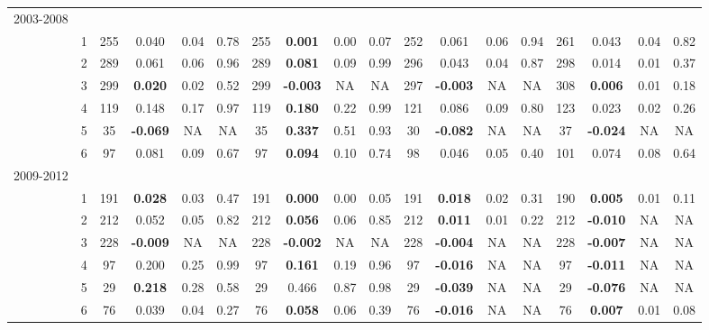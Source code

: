 \begin{sidewaystable}[p]
\begin{tabular}{p{1cm}p{.5cm}cccccccccccccccc}
2003-2008 \\
& \multicolumn{ 1}{c}{1} & 255 & 0.040  & 0.04  & 0.78  & 255 & \textbf{0.001 } & 0.00  & 0.07  & 252 & 0.061  & 0.06  & 0.94  & 261 & 0.043  & 0.04  & 0.82  \\ 
 & \multicolumn{ 1}{c}{2} & 289 & 0.061  & 0.06  & 0.96  & 289 & \textbf{0.081 } & 0.09  & 0.99  & 296 & 0.043  & 0.04  & 0.87  & 298 & 0.014  & 0.01  & 0.37  \\ 
 & \multicolumn{ 1}{c}{3} & 299 & \textbf{0.020 } & 0.02  & 0.52  & 299 & \textbf{-0.003 } & NA & NA & 297 & \textbf{-0.003 } & NA & NA & 308 & \textbf{0.006 } & 0.01  & 0.18  \\ 
 & \multicolumn{ 1}{c}{4} & 119 & 0.148  & 0.17  & 0.97  & 119 & \textbf{0.180 } & 0.22  & 0.99  & 121 & 0.086  & 0.09  & 0.80  & 123 & 0.023  & 0.02  & 0.26  \\ 
 & \multicolumn{ 1}{c}{5} & 35 & \textbf{-0.069 } & NA & NA & 35 & \textbf{0.337 } & 0.51  & 0.93  & 30 & \textbf{-0.082 } & NA & NA & 37 & \textbf{-0.024 } & NA & NA \\ 
 & \multicolumn{ 1}{c}{6} & 97 & 0.081  & 0.09  & 0.67  & 97 & \textbf{0.094 } & 0.10  & 0.74  & 98 & 0.046  & 0.05  & 0.40  & 101 & 0.074  & 0.08  & 0.64  \\ 
2009-2012\\
 & \multicolumn{ 1}{c}{1} & 191 & \textbf{0.028 } & 0.03  & 0.47  & 191 & \textbf{0.000 } & 0.00  & 0.05  & 191 & \textbf{0.018 } & 0.02  & 0.31  & 190 & \textbf{0.005 } & 0.01  & 0.11  \\ 
\multicolumn{ 1}{c}{} & \multicolumn{ 1}{c}{2} & 212 & 0.052  & 0.05  & 0.82  & 212 & \textbf{0.056 } & 0.06  & 0.85  & 212 & \textbf{0.011 } & 0.01  & 0.22  & 212 & \textbf{-0.010 } & NA & NA \\ 
\multicolumn{ 1}{c}{} & \multicolumn{ 1}{c}{3} & 228 & \textbf{-0.009 } & NA & NA & 228 & \textbf{-0.002 } & NA & NA & 228 & \textbf{-0.004 } & NA & NA & 228 & \textbf{-0.007 } & NA & NA \\ 
\multicolumn{ 1}{c}{} & \multicolumn{ 1}{c}{4} & 97 & 0.200  & 0.25  & 0.99  & 97 & \textbf{0.161 } & 0.19  & 0.96  & 97 & \textbf{-0.016 } & NA & NA & 97 & \textbf{-0.011 } & NA & NA \\ 
\multicolumn{ 1}{c}{} & \multicolumn{ 1}{c}{5} & 29 & \textbf{0.218 } & 0.28  & 0.58  & 29 & 0.466  & 0.87  & 0.98  & 29 & \textbf{-0.039 } & NA & NA & 29 & \textbf{-0.076 } & NA & NA \\ 
\multicolumn{ 1}{c}{} & \multicolumn{ 1}{c}{6} & 76 & 0.039  & 0.04  & 0.27  & 76 & \textbf{0.058 } & 0.06  & 0.39  & 76 & \textbf{-0.016 } & NA & NA & 76 & \textbf{0.007 } & 0.01  & 0.08  \\ 
\end{tabular}
\label{tab:TVposthoc}
\end{sidewaystable}